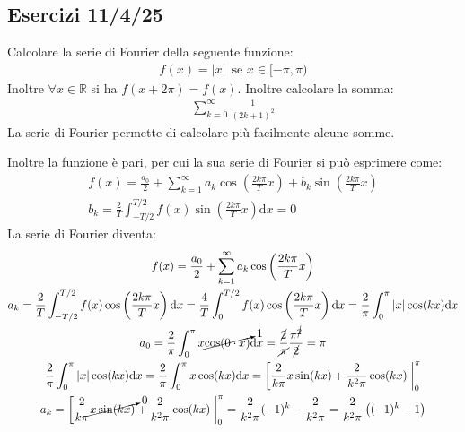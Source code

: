 \documentclass{article}
\newcommand{\df}{\mathrm{d}}
\numberwithin{equation}{subsection}
\begin{document}

\subsection{Esercizi 11/4/25}

Calcolare la serie di Fourier della seguente funzione:
\begin{gather*}
    f(x)=|x|\,\mbox{ se } x\in[-\pi,\pi)
\end{gather*}
Inoltre $\forall x\in\mathbb{R}$ si ha $f(x+2\pi)=f(x)$. Inoltre calcolare la somma:
\begin{gather*}
    \displaystyle\sum_{k=0}^\infty\frac{1}{(2k+1)^2}
\end{gather*}
La serie di Fourier permette di calcolare più facilmente alcune somme. %

Inoltre la funzione è pari, per cui la sua serie di Fourier si può esprimere come:
\begin{gather*}
    f(x)=\displaystyle\frac{a_0}{2}+\sum_{k=1}^\infty a_k\cos\left(\frac{2k\pi}{T}x\right)+b_k\sin\left(\frac{2k\pi}{T}x\right)\\
    b_k=\displaystyle\frac{2}{T}\int_{-T/2}^{T/2}f(x)\sin\left(\frac{2k\pi}{T}x\right)\df x=0
\end{gather*}
La serie di Fourier diventa:
\begin{gather*}
    f(x)=\displaystyle\frac{a_0}{2}+\sum_{k=1}^\infty a_k\cos\left(\frac{2k\pi}{T}x\right)\\
    a_k=\displaystyle\frac{2}{T}\int_{-T/2}^{T/2}f(x)\cos\left(\frac{2k\pi}{T}x\right)\df x=\displaystyle\frac{4}{T}\int_{0}^{T/2}f(x)\cos\left(\frac{2k\pi}{T}x\right)\df x=\frac{2}{\pi}\int_0^{\pi}|x|\cos(kx)\df x\\
    a_0=\displaystyle\frac{2}{\pi}\int_{0}^\pi x\cancelto{1}{\cos(0\cdot x)}\df x=\frac{\cancel{2}}{\cancel{\pi}}\frac{\pi^{\cancel{2}}}{\cancel{2}}=\pi\\
    \displaystyle\frac{2}{\pi}\int_0^{\pi}|x|\cos(kx)\df x=\frac{2}{\pi}\int_0^{\pi}x\cos(kx)\df x=\left[\frac{2}{k\pi}x\sin(kx)+\frac{2}{k^2\pi}\cos(kx)\right.\bigg|_0^\pi\\
    a_k=\left[\frac{2}{k\pi}\cancelto{0}{x\sin(kx)}+\frac{2}{k^2\pi}\cos(kx)\right.\bigg|_0^\pi=\frac{2}{k^2\pi}(-1)^k-\frac{2}{k^2\pi}=\frac{2}{k^2\pi}\left((-1)^{k}-1\right)
\end{gather*}
\end{document}
